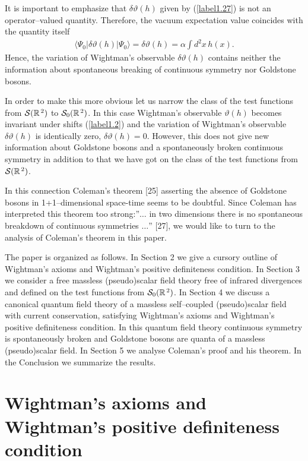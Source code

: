 \documentclass[a4paper,12pt] {article}
\begin{document}
It is important to emphasize that $\delta \vartheta(h)$ given by
(\ref{label1.27}) is not an operator--valued quantity. Therefore, the
vacuum expectation value coincides with the quantity itself
%
\begin{eqnarray}\label{label1.28}
\langle \Psi_0|\delta \vartheta(h)|\Psi_0\rangle = \delta \vartheta(h)
=\alpha\int d^2x\,h(x).
\end{eqnarray}
%
Hence, the variation of Wightman's observable $\delta \vartheta(h)$
contains neither the information about spontaneous breaking of
continuous symmetry nor Goldstone bosons.

In order to make this more obvious let us narrow the class of the test
functions from ${\cal S}(\mathbb{R}^{\,2})$ to ${\cal
S}_0(\mathbb{R}^{\,2})$. In this case Wightman's observable
$\vartheta(h)$ becomes invariant under shifts (\ref{label1.2}) and the
variation of Wightman's observable $\delta \vartheta(h)$ is
identically zero, $\delta \vartheta(h) = 0$. However, this does not
give new information about Goldstone bosons and a spontaneously broken
continuous symmetry in addition to that we have got on the class of
the test functions from ${\cal S}(\mathbb{R}^{\,2})$.

In this connection Coleman's theorem [25] asserting the absence of
Goldstone bosons in 1+1--dimensional space-time seems to be
doubtful. Since Coleman has interpreted this theorem too
strong:''$\ldots$ in two dimensions there is no spontaneous breakdown
of continuous symmetries $\ldots$'' [27], we would like to turn to the
analysis of Coleman's theorem in this paper.

The paper is organized as follows. In Section 2 we give a cursory
outline of Wightman's axioms and Wightman's positive definiteness
condition. In Section 3 we consider a free massless (pseudo)scalar
field theory free of infrared divergences and defined on the test
functions from ${\cal S}_0(\mathbb{R}^{\,2})$. In Section 4 we discuss
a canonical quantum field theory of a massless self--coupled
(pseudo)scalar field with current conservation, satisfying Wightman's
axioms and Wightman's positive definiteness condition.  In this
quantum field theory continuous symmetry is spontaneously broken and
Goldstone bosons are quanta of a massless (pseudo)scalar field. In
Section 5 we analyse Coleman's proof and his theorem. In the
Conclusion we summarize the results.

\section{Wightman's axioms and Wightman's positive definiteness 
condition}
\setcounter{equation}{0}
\end{document}
